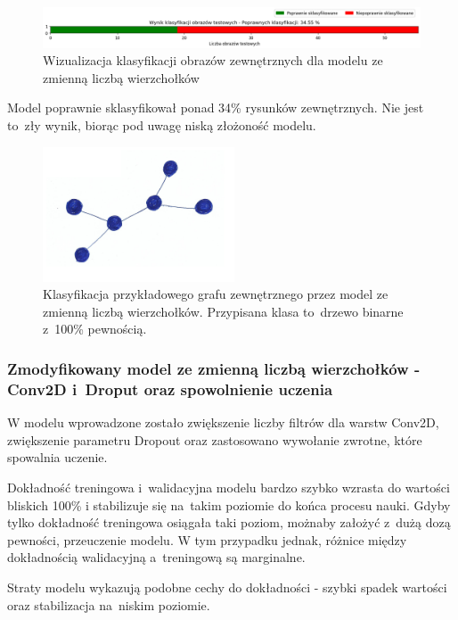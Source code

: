\begin{figure}[ht]
	\centering
	\includegraphics[width=15.5cm]{resources/tests/images/v3/multiple_edges_bar.png}
	\caption{Wizualizacja klasyfikacji obrazów zewnętrznych dla modelu ze zmienną liczbą wierzchołków}
	\label{Fig:tests-var-0c}
\end{figure}
\FloatBarrier

Model poprawnie sklasyfikował ponad 34\% rysunków zewnętrznych.
Nie jest to~zły wynik, biorąc pod uwagę niską złożoność modelu.

\begin{figure}[ht]
	\centering
	\includegraphics[height=4cm]{../graph_classification/test_graphs/drawn/tree-binary-1.png}
	\caption{Klasyfikacja przykładowego grafu zewnętrznego przez model ze zmienną liczbą wierzchołków.
		Przypisana klasa to~drzewo binarne z~100\% pewnością.}
	\label{Fig:tests-var-0d}
\end{figure}
\FloatBarrier

\subsubsection{Zmodyfikowany model ze zmienną liczbą wierzchołków - Conv2D i~Droput oraz spowolnienie uczenia}

W modelu wprowadzone zostało zwiększenie liczby filtrów dla warstw Conv2D, zwiększenie parametru Dropout
oraz zastosowano wywołanie zwrotne, które spowalnia uczenie.

Dokładność treningowa i~walidacyjna modelu bardzo szybko wzrasta do wartości bliskich 100\%
i stabilizuje się na~takim poziomie do końca procesu nauki.
Gdyby tylko dokładność treningowa osiągała taki poziom, możnaby założyć z~dużą dozą pewności, przeuczenie modelu.
W tym przypadku jednak, różnice między dokładnością walidacyjną a~treningową są marginalne.

Straty modelu wykazują podobne cechy do dokładności - szybki spadek wartości oraz stabilizacja na~niskim poziomie.

